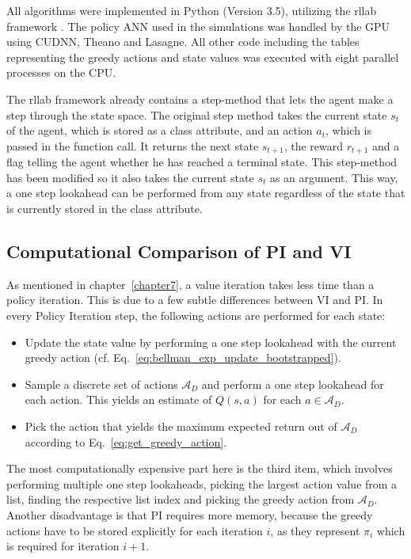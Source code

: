 All algorithms were implemented in Python (Version 3.5), utilizing the rllab framework \cite{rllab2018}. The policy ANN used in the simulations was handled by the GPU using CUDNN, Theano and Lasagne. All other code including the tables representing the greedy actions and state values was executed with eight parallel processes on the CPU. \smallbreak

The rllab framework already contains a step-method that lets the agent make a step through the state space. The original step method takes the current state $s_t$ of the agent, which is stored as a class attribute, and an action $a_t$, which is passed in the function call. It returns the next state $s_{t+1}$, the reward $r_{t+1}$ and a flag telling the agent whether he has reached a terminal state. This step-method has been modified so it also takes the current state $s_t$ as an argument. This way, a one step lookahead can be performed from any state regardless of the state that is currently stored in the class attribute.

\newpage
\subsection{Computational Comparison of PI and VI}
\label{sec:appendix_pi_vi}

As mentioned in chapter~\ref{chapter7}, a value iteration takes less time than a policy iteration. This is due to a few subtle differences between VI and PI. In every Policy Iteration step, the following actions are performed for each state:

\begin{itemize}
	\item Update the state value by performing a one step lookahead with the current greedy action (cf. Eq.~\ref{eq:bellman_exp_update_bootstrapped}).
	\item Sample a discrete set of actions $\mathcal{A}_D$ and perform a one step lookahead for each action. This yields an estimate of $Q(s,a)$ for each $a\in \mathcal{A}_D$.
	\item Pick the action that yields the maximum expected return out of $\mathcal{A}_D$ according to Eq.~\ref{eq:get_greedy_action}.
\end{itemize}

The most computationally expensive part here is the third item, which involves performing multiple one step lookaheads, picking the largest action value from a list, finding the respective list index and picking the greedy action from $\mathcal{A}_D$. Another disadvantage is that PI requires more memory, because the greedy actions have to be stored explicitly for each iteration $i$, as they represent $\pi_i$ which is required for iteration $i+1$.\bigbreak

